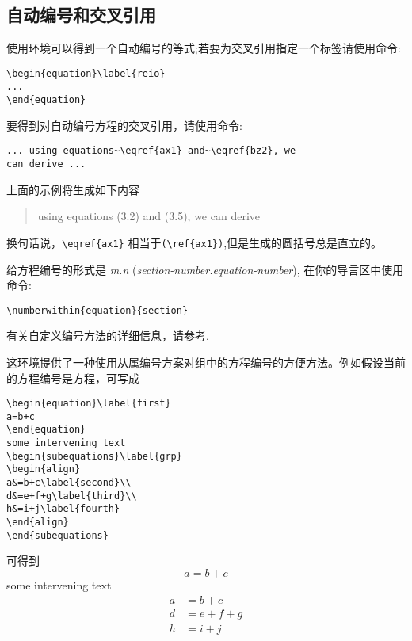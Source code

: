 \subsection{自动编号和交叉引用}
使用环境可以得到一个自动编号的等式;若要为交叉引用指定一个标签请使用命令:
\begin{verbatim}
\begin{equation}\label{reio}
...
\end{equation}
\end{verbatim}
要得到对自动编号方程的交叉引用，请使用命令:
\begin{verbatim}
... using equations~\eqref{ax1} and~\eqref{bz2}, we
can derive ...
\end{verbatim}
上面的示例将生成如下内容
\begin{quote}
  using equations (3.2) and (3.5), we can derive
\end{quote}
换句话说，\verb'\eqref{ax1}' 相当于\verb'(\ref{ax1})',但是生成的圆括号总是直立的。

给方程编号的形式是 \textit{m.n} (\textit{section-number.equation-number}),
在你的导言区中使用命令: 
\begin{verbatim}
\numberwithin{equation}{section}
\end{verbatim}

有关自定义编号方法的详细信息，请参考\cite[\S 6.3,
\S C.8.4]{lamport}.

这环境提供了一种使用从属编号方案对组中的方程编号的方便方法。例如假设当前的方程编号是方程，可写成
\begin{verbatim}
\begin{equation}\label{first}
a=b+c
\end{equation}
some intervening text
\begin{subequations}\label{grp}
\begin{align}
a&=b+c\label{second}\\
d&=e+f+g\label{third}\\
h&=i+j\label{fourth}
\end{align}
\end{subequations}
\end{verbatim}
可得到
\begin{equation}\label{first}
a=b+c
\end{equation}
some intervening text
\begin{subequations}\label{grp}
\begin{align}
a&=b+c\label{second}\\
d&=e+f+g\label{third}\\
h&=i+j\label{fourth}
\end{align}
\end{subequations}

